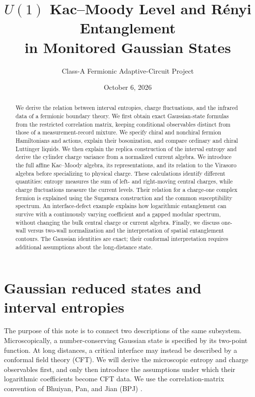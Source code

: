 \documentclass[aps,prb,onecolumn,nofootinbib,superscriptaddress]{revtex4-2}
\begin{document}
\title{\texorpdfstring{$U(1)$ Kac--Moody Level and R\'enyi Entanglement\\
in Monitored Gaussian States}{U(1) Kac-Moody Level and Renyi Entanglement in Monitored Gaussian States}}
\author{Class-A Fermionic Adaptive-Circuit Project}
\noaffiliation
\date{October 6, 2026}
\begin{abstract}
We derive the relation between interval entropies, charge fluctuations, and
the infrared data of a fermionic boundary theory. We first obtain exact
Gaussian-state formulas from the restricted correlation matrix, keeping
conditional observables distinct from those of a measurement-record mixture.
We specify chiral and nonchiral fermion Hamiltonians and actions, explain
their bosonization, and compare ordinary and chiral Luttinger liquids.
We then explain the replica construction of the interval entropy and derive
the cylinder charge variance from a normalized current algebra. We introduce
the full affine Kac--Moody algebra, its representations, and its relation
to the Virasoro algebra before specializing to physical charge. These
calculations identify different quantities: entropy measures the sum of
left- and right-moving central charges, while charge fluctuations measure
the current levels. Their relation for a charge-one complex fermion is
explained using the Sugawara construction and the common susceptibility
spectrum. An interface-defect example explains how logarithmic entanglement
can survive with a continuously varying coefficient and a gapped modular
spectrum, without changing the bulk central charge or current algebra.
Finally, we discuss one-wall versus two-wall normalization and
the interpretation of spatial entanglement contours. The Gaussian identities
are exact; their conformal interpretation requires additional assumptions
about the long-distance state.
\end{abstract}
\maketitle
\setcounter{tocdepth}{2}
\tableofcontents

\section{Gaussian reduced states and interval entropies}
\label{sec:gaussian}
The purpose of this note is to connect two descriptions of the same
subsystem. Microscopically, a number-conserving Gaussian state is specified
by its two-point function. At long distances, a critical interface may
instead be described by a conformal field theory (CFT). We will derive the
microscopic entropy and charge observables first, and only then introduce
the assumptions under which their logarithmic coefficients become CFT data.
We use the correlation-matrix convention of Bhuiyan, Pan, and Jian
(BPJ) \cite{BhuiyanPanJian2026}.
\end{document}
